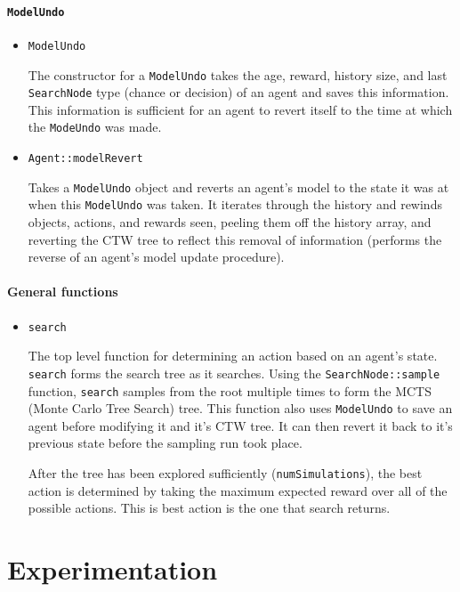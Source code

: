 \documentclass[pdftex,twoside,a4paper]{report}
\begin{document}
\subsubsection{\texttt{ModelUndo}}
\begin{itemize}
\item{\texttt{ModelUndo}

	The constructor for a \texttt{ModelUndo} takes the age, reward, history size, and last \texttt{SearchNode} type (chance or decision) of an agent and saves this information. This information is sufficient for an agent to revert itself to the time at which the \texttt{ModeUndo} was made.

}

\item{\texttt{Agent::modelRevert}

	Takes a \texttt{ModelUndo} object and reverts an agent's model to the state it was at when this \texttt{ModelUndo} was taken. It iterates through the history and rewinds objects, actions, and rewards seen, peeling them off the history array, and reverting the CTW tree to reflect this removal of information (performs the reverse of an agent's model update procedure).

}
\end{itemize}
\subsubsection{General functions}
\begin{itemize}
\item{\texttt{search}
	
	The top level function for determining an action based on an agent's state. \texttt{search} forms the search tree as it searches. Using the \texttt{SearchNode::sample} function, \texttt{search} samples from the root multiple times to form the MCTS (Monte Carlo Tree Search) tree. This function also uses \texttt{ModelUndo} to save an agent before modifying it and it's CTW tree. It can then revert it back to it's previous state before the sampling run took place.
	
	After the tree has been explored sufficiently (\texttt{numSimulations}), the best action is determined by taking the maximum expected reward over all of the possible actions. This is best action is the one that search returns.
}
	
\end{itemize}

\chapter{Experimentation}
\end{document}
